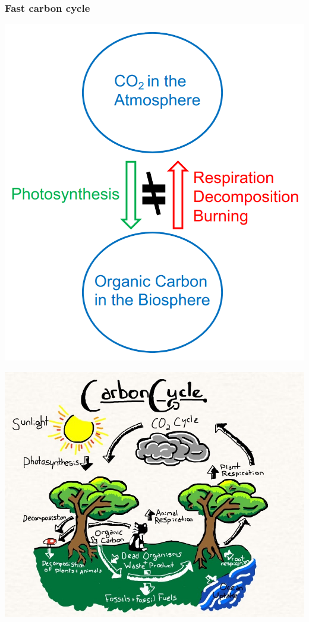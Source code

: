 \documentclass[11pt]{article}
\begin{document}
\newpage
\subsubsection{Fast carbon cycle}
\label{sec:orgea5ea8d}
\begin{center}
\includegraphics[scale=0.55]{./images/fast-carbon-cycle-diagram.png}
\end{center}

\begin{center}
\includegraphics[width=.9\linewidth]{./images/fast-carbon-cycle-picture.jpg}
\end{center}
\end{document}

